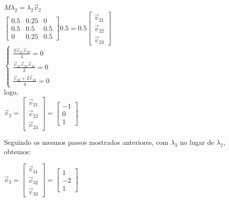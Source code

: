 \documentclass[14pt]{article}
\begin{document}
\begin{center}
    $ M\lambda_2 = \lambda_2 \vec{v}_2  $\\
    $ $\\
    $\begin{bmatrix}
    0.5&0.25&0\\
    0.5&0.5&0.5\\
    0&0.25&0.5
    \end{bmatrix} 0.5 = 0.5 \begin{bmatrix} \vec{v}_{21}\\ \vec{v}_{22}\\ \vec{v}_{23} \end{bmatrix}$\\
    $ $\\
    $ $\\
    $\begin{cases}
        \frac{2\vec{v}_{21} \vec{v}_{22}}{4} = 0\\
        \frac{\vec{v}_{21} \vec{v}_{22} \vec{v}_{23}}{2} = 0\\
        \frac{\vec{v}_{22}+2 \vec{v}_{23}}{4} = 0 \end{cases}
    $
    $ $\\
    $ $\\
    logo,\\
    $ $\\
    $\vec{v}_2 = \begin{bmatrix} \vec{v}_{21}\\ \vec{v}_{22}\\ \vec{v}_{23} \end{bmatrix} = \begin{bmatrix} -1\\ 0\\ 1 \end{bmatrix}$ 
\end{center}
$ $\\
$ $\\

Seguindo os mesmos passos mostrados anteriores, com $\lambda_3$ no lugar de $\lambda_2$, obtemos:

\begin{center}
    $\vec{v}_3 = \begin{bmatrix} \vec{v}_{31}\\ \vec{v}_{32}\\ \vec{v}_{33} \end{bmatrix} = \begin{bmatrix} 1\\ -2\\ 1 \end{bmatrix}$
\end{center}
\end{document}

